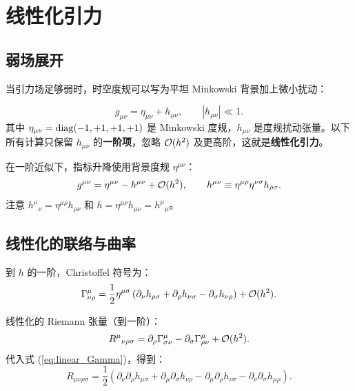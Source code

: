 \section{线性化引力}
\label{sec:linearized_gravity}

\subsection{弱场展开}

当引力场足够弱时，时空度规可以写为平坦 Minkowski 背景加上微小扰动：

\begin{definition}[弱场度规]
\begin{equation}
    \boxed{g_{\mu\nu} = \eta_{\mu\nu} + h_{\mu\nu}}, \qquad |h_{\mu\nu}| \ll 1.
    \label{eq:weak_field}
\end{equation}
其中 $\eta_{\mu\nu} = \operatorname{diag}(-1, +1, +1, +1)$ 是 Minkowski 度规，$h_{\mu\nu}$ 是度规扰动张量。以下所有计算只保留 $h_{\mu\nu}$ 的\textbf{一阶项}，忽略 $\mathcal{O}(h^2)$ 及更高阶，这就是\textbf{线性化引力}。
\end{definition}

在一阶近似下，指标升降使用背景度规 $\eta^{\mu\nu}$：
\begin{equation}
    g^{\mu\nu} = \eta^{\mu\nu} - h^{\mu\nu} + \mathcal{O}(h^2), \qquad h^{\mu\nu} \equiv \eta^{\mu\rho}\eta^{\nu\sigma}h_{\rho\sigma}.
\end{equation}
注意 $h^\mu{}_\nu = \eta^{\mu\rho}h_{\rho\nu}$ 和 $h = \eta^{\mu\nu}h_{\mu\nu} = h^\mu{}_\mu$。

\subsection{线性化的联络与曲率}

到 $h$ 的一阶，Christoffel 符号为：
\begin{equation}
    \Gamma^\mu_{\nu\rho} = \frac{1}{2}\eta^{\mu\sigma}\left(\partial_\nu h_{\rho\sigma} + \partial_\rho h_{\nu\sigma} - \partial_\sigma h_{\nu\rho}\right) + \mathcal{O}(h^2).
    \label{eq:linear_Gamma}
\end{equation}

线性化的 Riemann 张量（到一阶）：
\begin{equation}
    R^\mu{}_{\nu\rho\sigma} = \partial_\rho\Gamma^\mu_{\sigma\nu} - \partial_\sigma\Gamma^\mu_{\rho\nu} + \mathcal{O}(h^2).
\end{equation}
代入式 (\ref{eq:linear_Gamma})，得到：
\begin{equation}
    R_{\mu\nu\rho\sigma} = \frac{1}{2}\left(\partial_\nu\partial_\rho h_{\mu\sigma} + \partial_\mu\partial_\sigma h_{\nu\rho} - \partial_\mu\partial_\rho h_{\nu\sigma} - \partial_\nu\partial_\sigma h_{\mu\rho}\right).
    \label{eq:linear_Riemann}
\end{equation}

